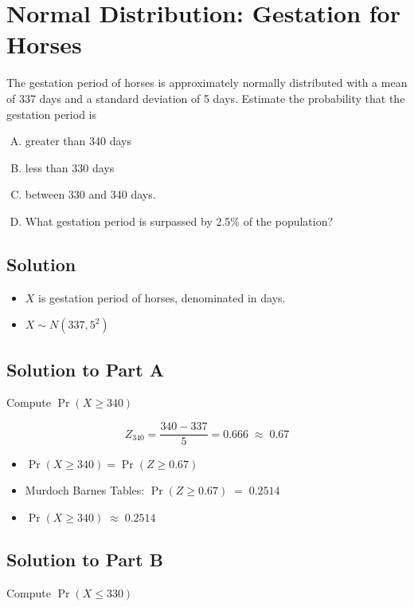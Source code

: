 \documentclass[a4paper,12pt]{article}
\begin{document}
\section*{Normal Distribution: Gestation for Horses}
\noindent The gestation period of horses is approximately normally distributed with a mean of 337 days and a standard deviation of 5 days. 
Estimate the probability that the gestation period is


\begin{enumerate}[(A)]
	\item       greater than 340 days
	
\item  less than 330 days
	
\item  between 330 and 340 days. 
	
\item  What gestation period is surpassed by 2.5\% of the population?
\end{enumerate}


\subsection*{Solution}
\begin{itemize}
\item $X$ is gestation period of horses, denominated in days.
\item $X \sim N(337,5^2)$
\end{itemize}

\subsection*{Solution to Part A}
Compute $\Pr(X\geq 340)$

\[Z_{340} = \frac{340-337}{5} = 0.666 \;\approx\; 0.67\]

\begin{itemize}
    \item $\Pr(X\geq 340) = \Pr(Z \geq 0.67)$
    \item Murdoch Barnes Tables: $\Pr(Z \geq 0.67) \;=\;  0.2514$
    \item $\Pr(X\geq 340) \; \approx \;  0.2514$
\end{itemize}

\subsection*{Solution to Part B}
Compute $\Pr(X\leq 330)$    
\end{document}
